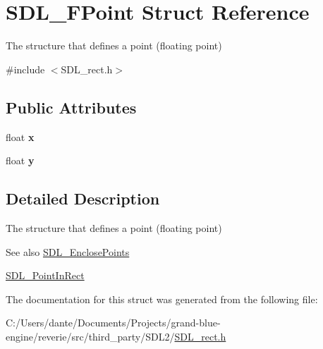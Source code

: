 \hypertarget{struct_s_d_l___f_point}{}\section{S\+D\+L\+\_\+\+F\+Point Struct Reference}
\label{struct_s_d_l___f_point}


The structure that defines a point (floating point)  




{\ttfamily \#include $<$S\+D\+L\+\_\+rect.\+h$>$}

\subsection*{Public Attributes}
\begin{DoxyCompactItemize}
\item 
\mbox{\label{struct_s_d_l___f_point_a5211b32bdc9f5ac3b9972ab48418d6f3}} 
float {\bfseries x}
\item 
\mbox{\label{struct_s_d_l___f_point_ac03695801666f08ee04b9d2e83f079ee}} 
float {\bfseries y}
\end{DoxyCompactItemize}


\subsection{Detailed Description}
The structure that defines a point (floating point) 

\begin{DoxySeeAlso}{See also}
\mbox{\hyperlink{_s_d_l__rect_8h_afcbb58dbba760b9e6fdb4b5d1ece015c}{S\+D\+L\+\_\+\+Enclose\+Points}} 

\mbox{\hyperlink{_s_d_l__rect_8h_a2f9708f2739ef234c34e6feda50b4d2c}{S\+D\+L\+\_\+\+Point\+In\+Rect}} 
\end{DoxySeeAlso}


The documentation for this struct was generated from the following file\+:\begin{DoxyCompactItemize}
\item 
C\+:/\+Users/dante/\+Documents/\+Projects/grand-\/blue-\/engine/reverie/src/third\+\_\+party/\+S\+D\+L2/\mbox{\hyperlink{_s_d_l__rect_8h}{S\+D\+L\+\_\+rect.\+h}}\end{DoxyCompactItemize}
